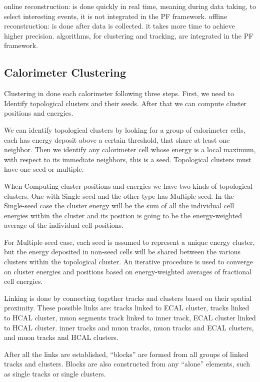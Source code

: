 
online reconstruction: is done quickly in real time, meaning during data taking,  to select interesting events, it is not integrated in the PF framework.
offline reconstruction: is done after data is collected. it takes more time to achieve higher precision. algorithms, for clustering and tracking, are integrated in the PF framework.



\subsection{Calorimeter Clustering}

Clustering in done each calorimeter following three steps. First, we need to Identify topological clusters and their seeds. After that we can compute cluster positions and energies.

We can identify topological clusters by looking for a group of calorimeter cells, each has energy deposit above a certain threshold, that share at least one neighbor. Then we identify any calorimeter cell whose energy is a local maximum, with respect to its immediate neighbors, this is a seed. Topological clusters must have one seed or multiple.

When Computing cluster positions and energies we have two kinds of topological clusters. One with Single-seed and the other type has Multiple-seed. In the Single-seed case the cluster energy will be the sum of all the individual cell energies within the cluster and its position is going to be the energy-weighted average of the individual cell positions.

For Multiple-seed case, each seed is assumed to represent a unique energy cluster, but the energy deposited in non-seed cells will be shared between the various clusters within the topological cluster.  An iterative procedure is used to converge on cluster energies and positions based on energy-weighted averages of fractional cell energies.

Linking is done by connecting together tracks and clusters based on their spatial proximity. These possible links are: tracks linked to ECAL cluster, tracks linked to HCAL cluster, muon segments track linked to inner track, ECAL cluster linked to HCAL cluster. inner tracks and muon tracks, muon tracks and ECAL clusters, and muon tracks and HCAL clusters.

After all the links are established, “blocks” are formed from all groups of linked tracks and clusters. Blocks are also constructed from any “alone” elements, such as single tracks or single clusters.

